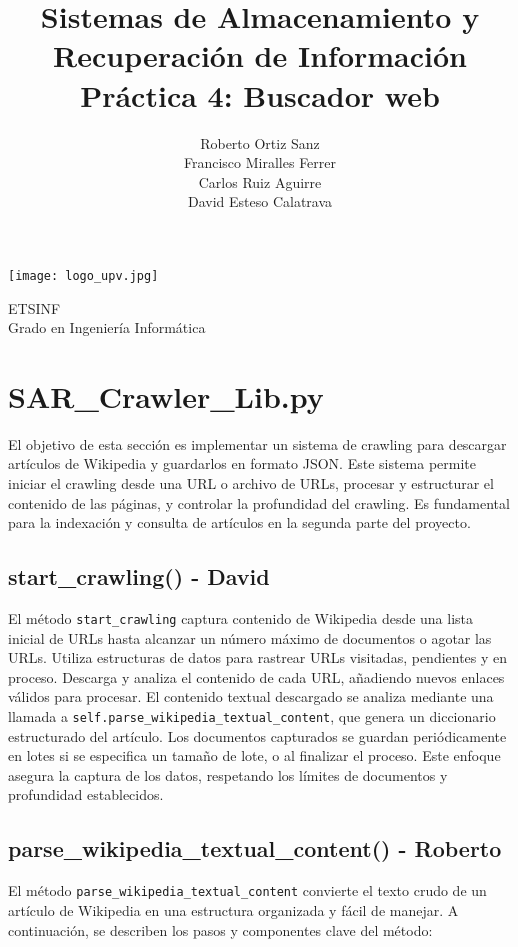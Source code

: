 \documentclass[12pt,a4paper]{article}
\title{\textbf{Sistemas de Almacenamiento y\\ Recuperación de Información\\Práctica 4: Buscador web}}
\author{
  Roberto Ortiz Sanz \\ 
  Francisco Miralles Ferrer \\ 
  Carlos Ruiz Aguirre \\ 
  David Esteso Calatrava
}
\begin{document}
\begin{titlepage}
\maketitle
\begin{center}

\vspace{10mm}

\texttt{[image: logo\_upv.jpg]}

\vfill

\large
ETSINF\\
Grado en Ingeniería Informática
\end{center}
\end{titlepage}

\tableofcontents

\newpage

\section{SAR\_Crawler\_Lib.py}

El objetivo de esta sección es implementar un sistema de crawling para descargar artículos de Wikipedia y guardarlos en formato JSON. Este sistema permite iniciar el crawling desde una URL o archivo de URLs, procesar y estructurar el contenido de las páginas, y controlar la profundidad del crawling. Es fundamental para la indexación y consulta de artículos en la segunda parte del proyecto.

\subsection{start\_crawling() - David}
El método \texttt{start\_crawling} captura contenido de Wikipedia desde una lista inicial de URLs hasta alcanzar un número máximo de documentos o agotar las URLs. Utiliza estructuras de datos para rastrear URLs visitadas, pendientes y en proceso. Descarga y analiza el contenido de cada URL, añadiendo nuevos enlaces válidos para procesar. El contenido textual descargado se analiza mediante una llamada a \texttt{self.parse\_wikipedia\_textual\_content}, que genera un diccionario estructurado del artículo. Los documentos capturados se guardan periódicamente en lotes si se especifica un tamaño de lote, o al finalizar el proceso. Este enfoque asegura la captura de los datos, respetando los límites de documentos y profundidad establecidos.

\subsection{parse\_wikipedia\_textual\_content() - Roberto}
El método \texttt{parse\_wikipedia\_textual\_content} convierte el texto crudo de un artículo de Wikipedia en una estructura organizada y fácil de manejar. A continuación, se describen los pasos y componentes clave del método:
\end{document}
